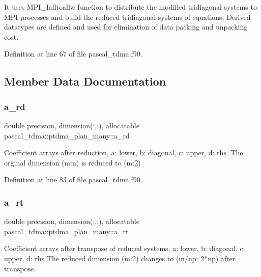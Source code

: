It uses M\+P\+I\+\_\+\+Ialltoallw function to distribute the modified tridiagonal systems to M\+PI processes and build the reduced tridiagonal systems of equations. Derived datatypes are defined and used for elimination of data packing and unpacking cost. 

Definition at line 67 of file pascal\+\_\+tdma.\+f90.



\subsection{Member Data Documentation}
\mbox{\label{structpascal__tdma_1_1ptdma__plan__many_a6d9101716eca623dc8c45075788f06bd}} 
\subsubsection{\texorpdfstring{a\_rd}{a\_rd}}
{\footnotesize\ttfamily double precision, dimension(\+:,\+:), allocatable pascal\+\_\+tdma\+::ptdma\+\_\+plan\+\_\+many\+::a\+\_\+rd}



Coefficient arrays after reduction, a\+: lower, b\+: diagonal, c\+: upper, d\+: rhs. The orginal dimension (m\+:n) is reduced to (m\+:2) 



Definition at line 83 of file pascal\+\_\+tdma.\+f90.

\mbox{\label{structpascal__tdma_1_1ptdma__plan__many_a42be039aee75c5393c22111cf232e77d}} 
\subsubsection{\texorpdfstring{a\_rt}{a\_rt}}
{\footnotesize\ttfamily double precision, dimension(\+:,\+:), allocatable pascal\+\_\+tdma\+::ptdma\+\_\+plan\+\_\+many\+::a\+\_\+rt}



Coefficient arrays after transpose of reduced systems, a\+: lower, b\+: diagonal, c\+: upper, d\+: rhs The reduced dimension (m\+:2) changes to (m/np\+: 2$\ast$np) after transpose. 



